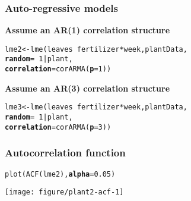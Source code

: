 \documentclass[color=usenames,dvipsnames]{beamer}\usepackage[]{graphicx}\usepackage[]{color}
\makeatletter
\newcommand{\hlnum}[1]{\textcolor[rgb]{0.69,0.494,0}{#1}}%
\newcommand{\hlopt}[1]{\textcolor[rgb]{0,0,0}{#1}}%
\newcommand{\hlstd}[1]{\textcolor[rgb]{0,0,0}{#1}}%
\newcommand{\hlkwb}[1]{\textcolor[rgb]{0,0.341,0.682}{#1}}%
\newcommand{\hlkwc}[1]{\textcolor[rgb]{0,0,0}{\textbf{#1}}}%
\newcommand{\hlkwd}[1]{\textcolor[rgb]{0.004,0.004,0.506}{#1}}%
\newenvironment{kframe}{%
 \def\at@end@of@kframe{}%
 \ifinner\ifhmode%
  \def\at@end@of@kframe{\end{minipage}}%
  \begin{minipage}{\columnwidth}%
 \fi\fi%
 \def\FrameCommand##1{\hskip\@totalleftmargin \hskip-\fboxsep
 \colorbox{shadecolor}{##1}\hskip-\fboxsep
     \hskip-\linewidth \hskip-\@totalleftmargin \hskip\columnwidth}%
 \MakeFramed {\advance\hsize-\width
   \@totalleftmargin\z@ \linewidth\hsize
   \@setminipage}}%
 {\par\unskip\endMakeFramed%
 \at@end@of@kframe}
\newenvironment{knitrout}{}{} %
\makeatother
\begin{document}
\begin{frame}[fragile]
  \frametitle{Auto-regressive models}
\vspace{0.5cm}
{\bf Assume an AR(1) correlation structure}
\pause
\begin{knitrout}
\color{fgcolor}\begin{kframe}
\begin{alltt}
\hlstd{lme2} \hlkwb{<-} \hlkwd{lme}\hlstd{(leaves} \hlopt{~} \hlstd{fertilizer}\hlopt{*}\hlstd{week, plantData,}
            \hlkwc{random}\hlstd{=}\hlopt{~}\hlnum{1}\hlopt{|}\hlstd{plant,}
            \hlkwc{correlation}\hlstd{=}\hlkwd{corARMA}\hlstd{(}\hlkwc{p}\hlstd{=}\hlnum{1}\hlstd{))}
\end{alltt}
\end{kframe}
\end{knitrout}
\vspace{1cm}
{\bf Assume an AR(3) correlation structure}
\pause
\begin{knitrout}
\color{fgcolor}\begin{kframe}
\begin{alltt}
\hlstd{lme3} \hlkwb{<-} \hlkwd{lme}\hlstd{(leaves} \hlopt{~} \hlstd{fertilizer}\hlopt{*}\hlstd{week, plantData,}
            \hlkwc{random}\hlstd{=}\hlopt{~}\hlnum{1}\hlopt{|}\hlstd{plant,}
            \hlkwc{correlation}\hlstd{=}\hlkwd{corARMA}\hlstd{(}\hlkwc{p}\hlstd{=}\hlnum{3}\hlstd{))}
\end{alltt}
\end{kframe}
\end{knitrout}
\end{frame}







\begin{frame}[fragile]
  \frametitle{Autocorrelation function}
\begin{knitrout}\small
{}\color{fgcolor}\begin{kframe}
\begin{alltt}
\hlkwd{plot}\hlstd{(}\hlkwd{ACF}\hlstd{(lme2),} \hlkwc{alpha}\hlstd{=}\hlnum{0.05}\hlstd{)}
\end{alltt}
\end{kframe}
\end{knitrout}
\centering
  \texttt{[image: figure/plant2-acf-1]} \\
\end{frame}
\end{document}

